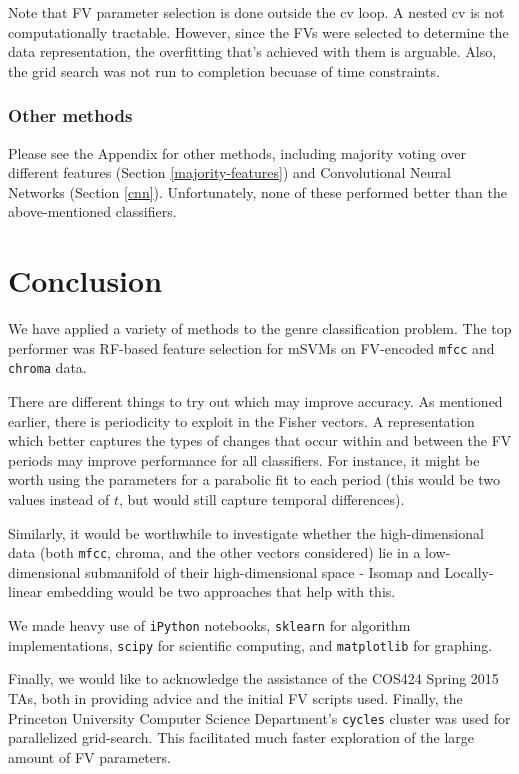 \documentclass{article}
\begin{document}
Note that FV parameter selection is done outside the cv loop. A nested cv is not computationally tractable. However, since the FVs were selected to determine the data representation, the overfitting that's achieved with them is arguable. Also, the grid search was not run to completion becuase of time constraints.

\subsubsection{Other methods}

Please see the Appendix for other methods, including majority voting over different features (Section \ref{majority-features}) and Convolutional Neural Networks (Section \ref{cnn}). Unfortunately, none of these performed better than the above-mentioned classifiers.

\section{Conclusion}

We have applied a variety of methods to the genre classification problem. The top performer was RF-based feature selection for mSVMs on FV-encoded \texttt{mfcc} and \texttt{chroma} data.

There are different things to try out which may improve accuracy. As mentioned earlier, there is periodicity to exploit in the Fisher vectors. A representation which better captures the types of changes that occur within and between the FV periods may improve performance for all classifiers. For instance, it might be worth using the parameters for a parabolic fit to each period (this would be two values instead of $t$, but would still capture temporal differences).

Similarly, it would be worthwhile to investigate whether the high-dimensional data (both \texttt{mfcc}, chroma, and the other vectors considered) lie in a low-dimensional submanifold of their high-dimensional space - Isomap and Locally-linear embedding would be two approaches that help with this.

We made heavy use of \texttt{iPython} \cite{iPython} notebooks, \texttt{sklearn} \cite{scikit-learn} for algorithm implementations, \texttt{scipy} \cite{scipy} for scientific computing, and \texttt{matplotlib} \cite{matplotlib} for graphing.

Finally, we would like to acknowledge the assistance of the COS424 Spring 2015 TAs, both in providing advice and the initial FV scripts used. Finally, the Princeton University Computer Science Department's \texttt{cycles} cluster was used for parallelized grid-search. This facilitated much faster exploration of the large amount of FV parameters. 
\pagebreak
\end{document}
